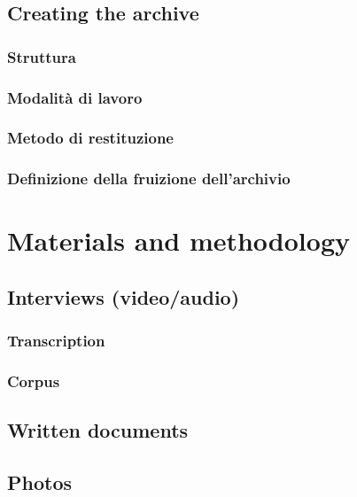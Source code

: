 \documentclass[]{book}
\begin{document}
\section{Creating the archive}\label{creating-the-archive}

\subsection{Struttura}\label{struttura}

\subsection{Modalità di lavoro}\label{modalita-di-lavoro}

\subsection{Metodo di restituzione}\label{metodo-di-restituzione}

\subsection{Definizione della fruizione
dell'archivio}\label{definizione-della-fruizione-dellarchivio}

\chapter{Materials and methodology}\label{materials}

\section{Interviews (video/audio)}\label{interviews-videoaudio}

\subsection{Transcription}\label{transcription}

\subsection{Corpus}\label{corpus}

\section{Written documents}\label{written-documents}

\section{Photos}\label{photos}
\end{document}
